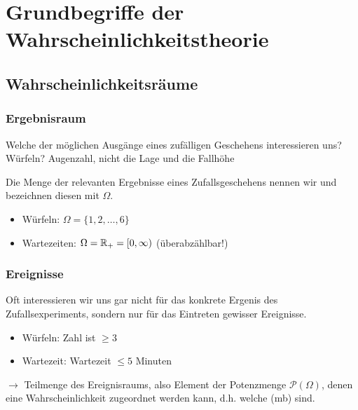 ﻿\chapter{Grundbegriffe der Wahrscheinlichkeitstheorie}
\label{chapter1}
\section{Wahrscheinlichkeitsräume}

\subsection*{Ergebnisraum}

Welche der möglichen Ausgänge eines zufälligen Geschehens interessieren uns?\\
Würfeln? Augenzahl, nicht die Lage und die Fallhöhe

\begin{definition}[Ergebnisraum]
	Die Menge der relevanten Ergebnisse eines Zufallsgeschehens nennen wir  und bezeichnen diesen mit $\Omega$.
\end{definition}

\begin{*example}
	\begin{itemize}
		\item Würfeln: $\Omega = \{1,2, \dots, 6\}$
		\item Wartezeiten: $\Omega = \mathbb{R}_{+} = [0, \infty)$ (überabzählbar!)
	\end{itemize}
\end{*example}

\subsection*{Ereignisse}

Oft interessieren wir uns gar nicht für das konkrete Ergenis des Zufallsexperiments, sondern nur für das Eintreten gewisser Ereignisse.
\begin{*example}
	\begin{itemize}
		\item Würfeln: Zahl ist $\ge 3$
		\item Wartezeit: Wartezeit $\le 5$ Minuten
	\end{itemize}
\end{*example}

$\longrightarrow$ Teilmenge des Ereignisraums, also Element der Potenzmenge $\mathscr{P}(\Omega)$, denen eine Wahrscheinlichkeit zugeordnet werden kann, d.h. welche  (mb) sind.

